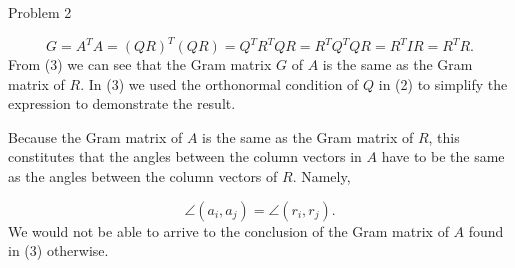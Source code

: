 \begin{problem}{Problem 2}
\begin{highlight}[Solution]
        \begin{equation}
            G = A^{T}A = (QR)^{T}(QR) = Q^{T}R^{T}QR = R^{T}Q^{T}QR = R^{T}IR = R^{T}R.
        \end{equation}
        From (3) we can see that the Gram matrix $G$ of $A$ is the same as the Gram matrix of $R$. In (3) we used the orthonormal condition of $Q$ in (2) to simplify the expression to demonstrate the
        result.

        Because the Gram matrix of $A$ is the same as the Gram matrix of $R$, this constitutes that the angles between the column vectors in $A$ have to be the same as the angles between the column
        vectors of $R$. Namely,

        \begin{equation}
            \angle (a_{i},a_{j}) = \angle (r_{i},r_{j}).
        \end{equation}
        We would not be able to arrive to the conclusion of the Gram matrix of $A$ found in (3) otherwise.
    \end{highlight}
\end{problem}

